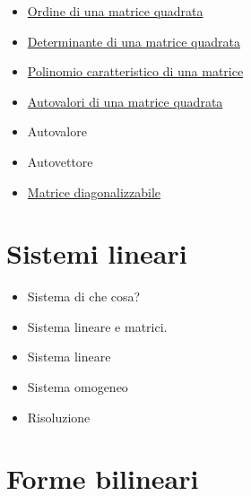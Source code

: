 \documentclass[a4paper,10pt]{article}
\begin{document}
\begin{itemize}
   \item \href{OrdineMatrice.html}{Ordine di una matrice quadrata}
   \item \href{DeterminanteMatrice.html}{Determinante di una matrice quadrata}
   \item \href{PolinomioMatrice.html}{Polinomio caratteristico di una matrice}
   \item \href{AutovaloriMatrice.html}{Autovalori di una matrice quadrata}
   \item Autovalore
   \item Autovettore
   \item \href{MatriceDiagonalizzabile.html}{Matrice diagonalizzabile}
\end{itemize}

\section{Sistemi lineari}
  \begin{itemize}
   \item Sistema di che cosa?
   \item Sistema lineare e matrici.
   \item Sistema lineare
   \item Sistema omogeneo
   \item Risoluzione
  \end{itemize}

\section{Forme bilineari}
\end{document}
